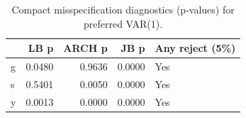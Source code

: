 \begin{table}[H]
\centering
\caption{Compact misspecification diagnostics (p-values) for preferred VAR(1).}
\label{tab:diag_compact}
\begin{tabular}{lrrrl}
\toprule
 & LB p & ARCH p & JB p & Any reject (5\%) \\
\midrule
g & 0.0480 & 0.9636 & 0.0000 & Yes \\
s & 0.5401 & 0.0050 & 0.0000 & Yes \\
y & 0.0013 & 0.0000 & 0.0000 & Yes \\
\bottomrule
\end{tabular}
\end{table}
